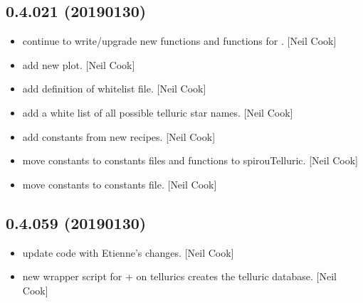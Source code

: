 \documentclass[a4paper,10pt,english]{report}
\begin{document}
\subsection{0.4.021 (2019\sphinxhyphen{}01\sphinxhyphen{}30)}
\label{\detokenize{misc/changelog:id221}}\begin{itemize}
\item {} 
 \sphinxhyphen{} continue to write/upgrade new  functions
and functions for . {[}Neil Cook{]}

\item {} 
 \sphinxhyphen{} add new  plot. {[}Neil Cook{]}

\item {} 
 \sphinxhyphen{} add definition of whitelist file. {[}Neil Cook{]}

\item {} 
 \sphinxhyphen{} add a white list of all possible telluric star
names. {[}Neil Cook{]}

\item {} 
 \sphinxhyphen{} add constants from new recipes. {[}Neil Cook{]}

\item {} 
 \sphinxhyphen{} move constants to constants files and functions
to spirouTelluric. {[}Neil Cook{]}

\item {} 
 \sphinxhyphen{} move constants to constants file. {[}Neil Cook{]}

\end{itemize}


\subsection{0.4.059 (2019\sphinxhyphen{}01\sphinxhyphen{}30)}
\label{\detokenize{misc/changelog:id222}}\begin{itemize}
\item {} 
 \sphinxhyphen{} update code with Etienne’s changes. {[}Neil Cook{]}

\item {} 
 \sphinxhyphen{} new wrapper script for  +  on
tellurics \textendash{} creates the telluric database. {[}Neil Cook{]}

\end{itemize}
\end{document}
